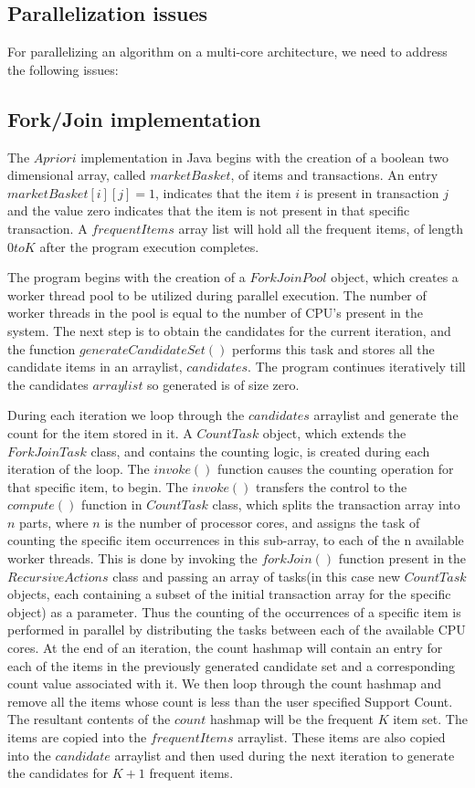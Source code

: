 \documentclass[conference]{IEEEtran}
\begin{document}
\subsection{Parallelization issues}
For parallelizing an algorithm on a multi-core architecture, we need to address the following issues:

\subsection{Fork/Join implementation}
The $Apriori$ implementation in Java begins with the creation of a boolean two dimensional array, called $marketBasket$, of items and transactions. An entry $marketBasket[i][j]=1$, indicates that the item $i$ is present in transaction $j$ and the value zero indicates that the item is not present in that specific transaction. A $frequentItems$ array list will hold all the frequent items, of length $0 to K$ after the program execution completes. 

The program begins with the creation of a $ForkJoinPool$ object, which creates a worker thread pool to be utilized during parallel execution. The number of worker threads in the pool is equal to the number of CPU's present in the system. The next step is to obtain the candidates for the current iteration, and the function $generateCandidateSet()$ performs this task and stores all the candidate items in an arraylist, $candidates$. The program continues iteratively till the candidates $arraylist$ so generated is of size zero.

During each iteration we loop through the $candidates$ arraylist and generate the count for the item stored in it. A $CountTask$ object, which extends the $ForkJoinTask$ class, and contains the counting logic, is created during each iteration of the loop. The $invoke()$ function causes the counting operation for that specific item, to begin. The $invoke()$ transfers the control to the $compute()$ function in $CountTask$ class, which splits the transaction array into $n$ parts, where $n$ is the number of processor cores, and assigns the task of counting the specific item occurrences in this sub-array, to each of the n available worker threads.  This is done by invoking the $forkJoin()$ function present in the $RecursiveActions$ class and passing an array of tasks(in this case new $CountTask$ objects, each containing a subset of the initial transaction array for the specific object) as a parameter. Thus the counting of the occurrences of a specific item is performed in parallel by distributing the tasks between each of the available CPU cores. At the end of an iteration, the count hashmap will contain an entry for each of the items in the previously generated candidate set and a corresponding count value associated with it. 
We then loop through the count hashmap and remove all the items whose count is less than the user specified Support Count.  The resultant contents of the $count$ hashmap will be the frequent $K$ item set. The items are copied into the $frequentItems$ arraylist. These items are also copied into the $candidate$ arraylist and then used during the next iteration to generate the candidates for $K+1$ frequent items.
\end{document}
